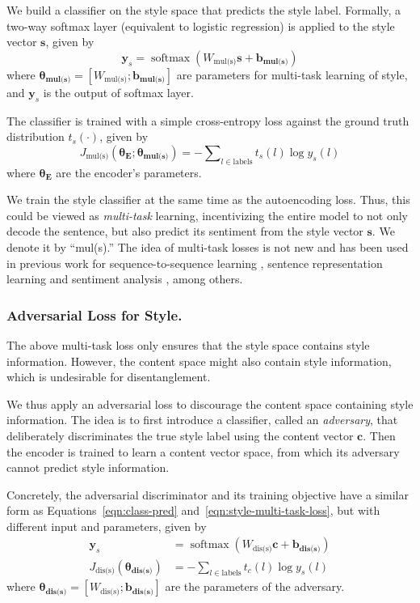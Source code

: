 \documentclass[letterpaper]{article} %
\newcommand{\loss}[1]{J_{\text{#1}}}
\newcommand{\nnweight}[1]{\bm{\theta_{\text{#1}}}}
\newcommand{\weight}[1]{W_{\text{#1}}}
\newcommand{\bias}[1]{\bm{b_{\text{#1}}}}
\begin{document}
We build a classifier on the style space that predicts the style label. Formally, a two-way softmax layer (equivalent to logistic regression) is applied to the style vector $\bm s$, given by
\begin{equation} \label{eqn:class-pred}
	\bm y_s = \operatorname{softmax}(\weight{mul(s)} \bm s + \bias{mul(s)})
\end{equation}
where $\nnweight{mul(s)}=[\weight{mul(s)}; \bias{mul(s)}]$ are parameters for multi-task learning of style, and $\bm y_s$ is the output of softmax layer.

The classifier is trained with a simple cross-entropy loss against the ground truth distribution $t_s(\cdot)$, given by
\begin{equation} \label{eqn:style-multi-task-loss}
	\loss{mul(s)}(\nnweight{E};\nnweight{mul(s)}) = - \sum\nolimits_{l\in\text{labels}} t_s(l)\log y_s(l)
\end{equation}
where $\nnweight{E}$ are the encoder's parameters.

We train the style classifier at the same time as the autoencoding loss.
Thus, this could be viewed as \textit{multi-task} learning, incentivizing the entire model to not only decode the sentence, but also predict its sentiment from the style vector $\bm  s$.
We denote it by ``mul(s).''
The idea of multi-task losses is not new and has been used in previous work for sequence-to-sequence learning \cite{luong2015multi}, sentence representation learning \cite{jernite2017discourse} and sentiment analysis \cite{balikas2017multitask}, among others.


\subsubsection{Adversarial Loss for Style.}
\label{ssec:adversarial-style-objective}

The above multi-task loss only ensures that the style space contains style information.
However, the content space might also contain style information, which is undesirable for disentanglement.

We thus apply an adversarial loss to discourage the content space containing style information.
The idea is to first introduce a classifier, called an \textit{adversary}, that deliberately discriminates the true style label using the content vector $\bm c$.
Then the encoder is trained to learn a content vector space, from which its adversary cannot predict style information.

Concretely, the adversarial discriminator and its training objective have a similar form as Equations~\ref{eqn:class-pred} and~\ref{eqn:style-multi-task-loss}, but with different input and parameters, given by
\begin{align}
	\label{eqn:adv-disc-loss}
	\bm y_s                          & = \operatorname{softmax}(\weight{dis(s)} \bm c + \bias{dis(s)}) \\
	\loss{dis(s)}(\nnweight{dis(s)}) & = - \sum\nolimits_{l\in\text{labels}} t_c(l)\log y_s(l)
\end{align}
where $\nnweight{dis(s)}=[\weight{dis(s)}; \bias{dis(s)}]$ are the parameters of the adversary.
\end{document}
